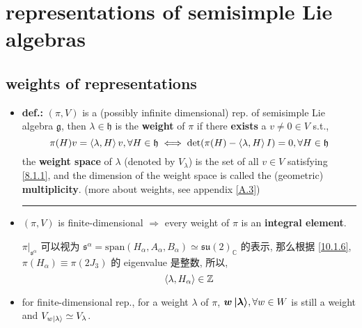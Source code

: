 \chapter{representations of semisimple Lie algebras}
\section{weights of representations} \label{8.1}
\begin{itemize}
	\item \textbf{def.:} $(\pi, V)$ is a (possibly infinite dimensional) rep. of semisimple Lie algebra $\mathfrak{g}$, then $\lambda \in \mathfrak{h}$ is the \textbf{weight} of $\pi$ if there \textbf{exists} a $v \neq 0 \in V$ s.t.,
	\begin{equation} \label{8.1.1}
		\pi(H) v = \braket{\lambda, H} v, \forall H \in \mathfrak{h} \iff \det(\pi(H) - \braket{\lambda, H} I) = 0, \forall H \in \mathfrak{h}
	\end{equation}
	the \textbf{weight space} of $\lambda$ (denoted by $V_\lambda$) is the set of all $v \in V$ satisfying \eqref{8.1.1}, and the dimension of the weight space is called the (geometric) \textbf{multiplicity}. (more about weights, see appendix \ref{A.3})
	
	\noindent\rule[0.5ex]{\linewidth}{0.5pt} %
	
	\item $(\pi, V)$ is finite-dimensional $\Longrightarrow$ every weight of $\pi$ is an \textbf{integral element}.
	
	\begin{tcolorbox}[title=proof:]
		$\pi \big|_{\mathfrak{s}^\alpha}$ 可以视为 $\mathfrak{s}^\alpha = \mathrm{span}(H_\alpha, A_\alpha, B_\alpha) \simeq \mathfrak{su}(2)_\mathbb{C}$ 的表示, 那么根据 \eqref{10.1.6}, $\pi(H_\alpha) \equiv \pi(2 J_3)$ 的 eigenvalue 是整数, 所以,
		\begin{equation}
			\braket{\lambda, H_\alpha} \in \mathbb{Z}
		\end{equation}
	\end{tcolorbox}
	
	\item for finite-dimensional rep., for a weight $\lambda$ of $\pi$, $\boldsymbol{w \ket{\lambda}}, \forall w \in W$ is still a weight and $V_{w \ket{\lambda}} \simeq V_\lambda$.
	

\end{itemize}
